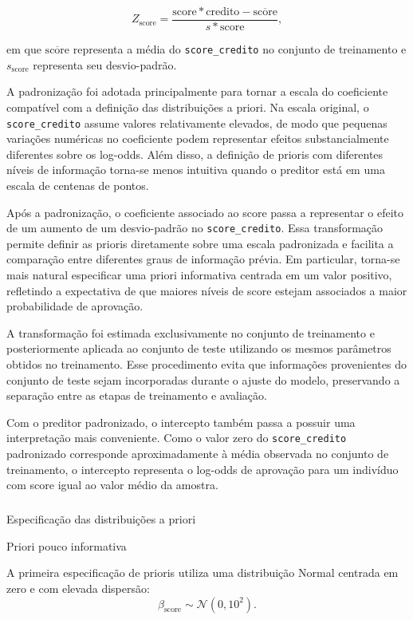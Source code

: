 \documentclass[
  brazilian,
  12pt,
  letterpaper,
  DIV=11,
  numbers=noendperiod]{scrartcl}
\makeatletter
\let\oldsubparagraph\subparagraph
\renewcommand{\subparagraph}{
    \@ifstar
      \xxxSubParagraphStar
      \xxxSubParagraphNoStar
  }
\newcommand{\xxxSubParagraphStar}[1]{\oldsubparagraph*{#1}\mbox{}}
\newcommand{\xxxSubParagraphNoStar}[1]{\oldsubparagraph{#1}\mbox{}}
\makeatother
\begin{document}
\[
Z_{\text{score}} =
\frac{\text{score}*{\text{credito}}-\overline{\text{score}}}
{s*{\text{score}}},
\]

em que \(\overline{\text{score}}\) representa a média do
\texttt{score\_credito} no conjunto de treinamento e
\(s_{\text{score}}\) representa seu desvio-padrão.

A padronização foi adotada principalmente para tornar a escala do
coeficiente compatível com a definição das distribuições a priori. Na
escala original, o \texttt{score\_credito} assume valores relativamente
elevados, de modo que pequenas variações numéricas no coeficiente podem
representar efeitos substancialmente diferentes sobre os log-odds. Além
disso, a definição de prioris com diferentes níveis de informação
torna-se menos intuitiva quando o preditor está em uma escala de
centenas de pontos.

Após a padronização, o coeficiente associado ao score passa a
representar o efeito de um aumento de um desvio-padrão no
\texttt{score\_credito}. Essa transformação permite definir as prioris
diretamente sobre uma escala padronizada e facilita a comparação entre
diferentes graus de informação prévia. Em particular, torna-se mais
natural especificar uma priori informativa centrada em um valor
positivo, refletindo a expectativa de que maiores níveis de score
estejam associados a maior probabilidade de aprovação.

A transformação foi estimada exclusivamente no conjunto de treinamento e
posteriormente aplicada ao conjunto de teste utilizando os mesmos
parâmetros obtidos no treinamento. Esse procedimento evita que
informações provenientes do conjunto de teste sejam incorporadas durante
o ajuste do modelo, preservando a separação entre as etapas de
treinamento e avaliação.

Com o preditor padronizado, o intercepto também passa a possuir uma
interpretação mais conveniente. Como o valor zero do
\texttt{score\_credito} padronizado corresponde aproximadamente à média
observada no conjunto de treinamento, o intercepto representa o log-odds
de aprovação para um indivíduo com score igual ao valor médio da
amostra.

\subparagraph{Especificação das distribuições a
priori}\label{especificauxe7uxe3o-das-distribuiuxe7uxf5es-a-priori}

Priori pouco informativa

A primeira especificação de prioris utiliza uma distribuição Normal
centrada em zero e com elevada dispersão: \[
\beta_{\text{score}} \sim \mathcal{N}(0,10^2).
\]
\end{document}
